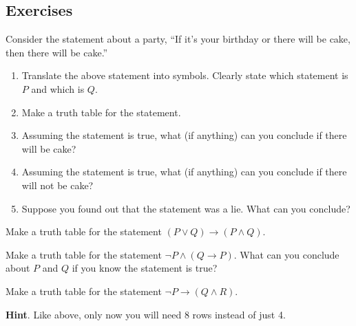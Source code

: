 \documentclass[10pt,]{book}
\theoremstyle{plain}
\theoremstyle{definition}
\theoremstyle{definition}
\theoremstyle{definition}
\theoremstyle{definition}
\numberwithin{equation}{chapter}
\def\imp{\rightarrow}
\begin{document}
\subsection*{Exercises}\label{exercises_sec-logic}
\begin{divisionexercise}{1}\hypertarget{exercise-220}{}
\hypertarget{p-1855}{}%
Consider the statement about a party, ``If it's your birthday or there will be cake, then there will be cake.''%
\par
\hypertarget{p-1856}{}%
\leavevmode%
\begin{enumerate}[label=(\alph*)]
\item\hypertarget{li-641}{}\hypertarget{p-1857}{}%
Translate the above statement into symbols. Clearly state which statement is \(P\) and which is \(Q\).%
\item\hypertarget{li-642}{}\hypertarget{p-1858}{}%
Make a truth table for the statement.%
\item\hypertarget{li-643}{}\hypertarget{p-1859}{}%
Assuming the statement is true, what (if anything) can you conclude if there will be cake?%
\item\hypertarget{li-644}{}\hypertarget{p-1860}{}%
Assuming the statement is true, what (if anything) can you conclude if there will not be cake?%
\item\hypertarget{li-645}{}\hypertarget{p-1861}{}%
Suppose you found out that the statement was a lie. What can you conclude?%
\end{enumerate}
%
\end{divisionexercise}%
\begin{divisionexercise}{2}\hypertarget{exercise-221}{}
\hypertarget{p-1867}{}%
Make a truth table for the statement \((P \vee Q) \imp (P \wedge Q)\).%
\end{divisionexercise}%
\begin{divisionexercise}{3}\hypertarget{exercise-222}{}
\hypertarget{p-1868}{}%
Make a truth table for the statement \(\neg P \wedge (Q \imp P)\). What can you conclude about \(P\) and \(Q\) if you know the statement is true?%
\end{divisionexercise}%
\begin{divisionexercise}{4}\hypertarget{exercise-223}{}
\hypertarget{p-1870}{}%
Make a truth table for the statement \(\neg P \imp (Q \wedge R)\).%
\par\smallskip%
\noindent\textbf{Hint}.\hypertarget{hint-71}{}\quad%
\hypertarget{p-1871}{}%
Like above, only now you will need 8 rows instead of just 4.%
\end{divisionexercise}%
\end{document}

